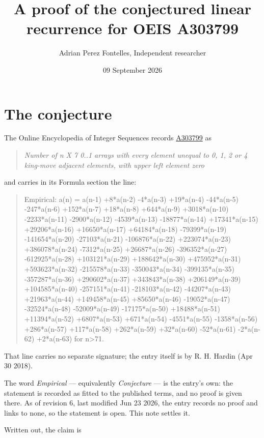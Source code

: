 \documentclass[11pt]{article}
\title{A proof of the conjectured linear recurrence for OEIS A303799}
\author{Adrian Perez Fontelles, Independent researcher}
\date{09 September 2026}
\theoremstyle{definition}
\begin{document}
\maketitle
\section{The conjecture}

The Online Encyclopedia of Integer Sequences records \href{https://oeis.org/A303799}{A303799} as

\begin{quote}\itshape Number of n X 7 0..1 arrays with every element unequal to 0, 1, 2 or 4 king-move adjacent elements, with upper left element zero\end{quote}

and carries in its Formula section the line:

\begin{quote}\ttfamily Empirical: a(n) = a(n-1) +8*a(n-2) -4*a(n-3) +19*a(n-4) -44*a(n-5) -247*a(n-6) +152*a(n-7) +18*a(n-8) +644*a(n-9) +3018*a(n-10) -2233*a(n-11) -2900*a(n-12) -4539*a(n-13) -18877*a(n-14) +17341*a(n-15) +29206*a(n-16) +16650*a(n-17) +64184*a(n-18) -79399*a(n-19) -141654*a(n-20) -27103*a(n-21) -106876*a(n-22) +223074*a(n-23) +386078*a(n-24) -7312*a(n-25) +26687*a(n-26) -396352*a(n-27) -612925*a(n-28) +103121*a(n-29) +188642*a(n-30) +475952*a(n-31) +593623*a(n-32) -215578*a(n-33) -350043*a(n-34) -399135*a(n-35) -357287*a(n-36) +290602*a(n-37) +343843*a(n-38) +206149*a(n-39) +104585*a(n-40) -257151*a(n-41) -218103*a(n-42) -44207*a(n-43) +21963*a(n-44) +149458*a(n-45) +85650*a(n-46) -19052*a(n-47) -32524*a(n-48) -52009*a(n-49) -17175*a(n-50) +18488*a(n-51) +11394*a(n-52) +6807*a(n-53) +671*a(n-54) -4551*a(n-55) -1358*a(n-56) +286*a(n-57) +117*a(n-58) +262*a(n-59) +32*a(n-60) -52*a(n-61) -2*a(n-62) +2*a(n-63) for n>71.\end{quote}

That line carries no separate signature; the entry itself is by R. H. Hardin (Apr 30 2018).

The word {\itshape Empirical} --- equivalently {\itshape Conjecture} --- is the entry's own: the statement is recorded as fitted to the published terms, and no proof is given there. As of revision 6, last modified Jun 23 2026, the entry records no proof and links to none, so the statement is open. This note settles it.

Written out, the claim is
\end{document}
